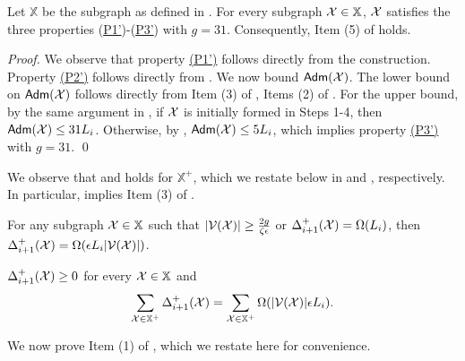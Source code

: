 \begin{lemma}\label{lm:XProp1E} Let $\mathbb{X}$ be the subgraph as defined in . For every subgraph $\mathcal{X} \in \mathbb{X}$, $\mathcal{X}$ satisfies the three properties (\hyperlink{P1'}{P1'})-(\hyperlink{P3'}{P3'}) with $g = 31$. Consequently, Item (5) of  holds.
\end{lemma}
\begin{proof} 	We observe that property \hyperlink{P1'}{(P1')} follows directly from the construction.  Property \hyperlink{P2'}{(P2')} follows directly from . We now bound  $\mathsf{Adm}(\mathcal{X})$. The lower bound on $\mathsf{Adm}(\mathcal{X})$ follows directly from Item (3) of , Items (2) of . For the upper bound, by the same argument in , if $\mathcal{X}$ is initially formed in Steps 1-4, then $\mathsf{Adm}(\mathcal{X})\leq 31L_i$. Otherwise, by , $\mathsf{Adm}(\mathcal{X}) \leq 5L_i$, which implies  property \hyperlink{P3'}{(P3')} with $g= 31$. \qed %
\end{proof}



 We observe that  and   holds for $\mathbb{X}^{+}$, which we restate below in  and , respectively. In particular,   implies Item (3) of .


\begin{lemma}\label{lm:manynodes1E} For any subgraph $\mathcal{X} \in \mathbb{X}$ such that $|\mathcal{V}(\mathcal{X})|\geq \frac{2g}{\zeta\epsilon}$ or $\Delta^+_{i+1}(\mathcal{X}) = \Omega(L_i)$, then $\Delta^+_{i+1}(\mathcal{X}) = \Omega(\epsilon L_i |\mathcal{V}(\mathcal{X})|)$.
\end{lemma}

\begin{lemma}\label{lm:Item3Clustering1EHigh}   $\Delta_{i+1}^+(\mathcal{X}) \geq 0$ for every $\mathcal{X} \in \mathbb{X}$ and 
	\begin{equation*}
		\sum_{\mathcal{X} \in \mathbb{X}^{+}} \Delta_{i+1}^+(\mathcal{X}) = \sum_{\mathcal{X} \in\mathbb{X}^{+}} \Omega(|\mathcal{V}(\mathcal{X})|\epsilon L_i). 
	\end{equation*}
\end{lemma}


We now prove Item (1) of , which we restate here for convenience.


